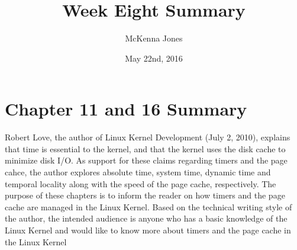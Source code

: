 \documentclass[letterpaper,10pt]{article}
\title{Week Eight Summary}
\author{McKenna Jones}
\date{May 22nd, 2016}
\begin{document}
\begin{titlepage}
\maketitle
\end{titlepage}

\section{Chapter 11 and 16 Summary}
Robert Love, the author of Linux Kernel Development (July 2, 2010), explains that time is essential to the kernel, and that the kernel uses the disk cache to minimize disk I/O. As support for these claims regarding timers and the page cahce, the author explores absolute time, system time, dynamic time and temporal locality along with the speed of the page cache, respectively. The purpose of these chapters is to inform the reader on how timers and the page cache are managed in the Linux Kernel. Based on the technical writing style of the author, the intended audience is anyone who has a basic knowledge of the Linux Kernel and would like to know more about timers and the page cache in the Linux Kernel
\end{document}
